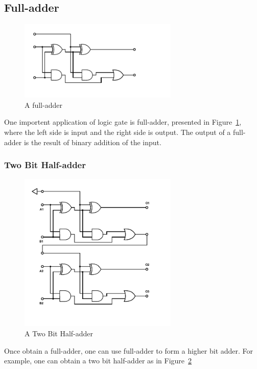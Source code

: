\documentclass[aps,prl,reprint]{revtex4-1}
\begin{document}
    \subsection{Full-adder}
        \begin{figure}[h]
            \centering
            \includegraphics[height=1.5in]{image/Full-Adder.pdf}
            \caption{A full-adder}
            \label{fig:fullAdder}
        \end{figure}
        One importent application of logic gate is full-adder, presented in Figure~\ref{fig:fullAdder}, where the left side is input and the right side is output. The output of a full-adder is the result of binary addition of the input.
        \subsubsection{Two Bit Half-adder}
            \begin{figure}[h]
                \centering
                \includegraphics[height=3in]{image/Two-Bit-Half-adder.pdf}
                \caption{A Two Bit Half-adder}
                \label{fig:twoBitHalfAdder}
            \end{figure}
            Once obtain a full-adder, one can use full-adder to form a higher bit adder. For example, one can obtain a two bit half-adder as in Figure~\ref{fig:twoBitHalfAdder}
\end{document}
